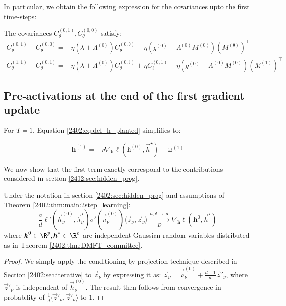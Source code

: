 In particular, we obtain the following expression for the covariances upto the first time-steps:
\begin{lemma}\label{2402:lem:cov_1}
The covariances $C_\theta^{(0,1)},C_\theta^{(0,0)}$ satisfy:
\begin{align}
    C_\theta^{(0,1)} - C_\theta^{(0,0)} =  - \eta \left(\lambda + \Lambda^{(0)}\right)C_\theta^{(0,0)} - \eta \left(g^{(0)} - \Lambda^{(0)}M^{(0)}\right) \left(M^{(0)}\right)^\top
\end{align}
\begin{align}
    C_\theta^{(1,1)} - C_\theta^{(0,1)} =  - \eta \left(\lambda + \Lambda^{(0)}\right)C_\theta^{(0,1)} + \eta C_\ell^{(0,1)} - \eta \left(g^{(0)} - \Lambda^{(0)}M^{(0)}\right) \left(M^{(1)}\right)^\top
\end{align}
\end{lemma}


\subsection{Pre-activations at the end of the first gradient update}\label{2402:sec:app:proof_hidden_prog}
For $T=1$, Equation \eqref{2402:eq:def_h_planted} simplifies to:

\begin{equation} \label{2402:eq:h_1}
        \boldsymbol{h}^{(1)} = - \eta \nabla_{\boldsymbol{h}} \ell(\boldsymbol{h}^{(0)}, \vec{h}^\star) + \boldsymbol{\omega}^{(1)}
    \end{equation}

We now show that the first term exactly correspond to the contributions considered in section \ref{2402:sec:hidden_prog}.

\begin{lemma}
Under the notation in section \ref{2402:sec:hidden_prog} and assumptions of Theorem \ref{2402:thm:main:2step_learning}:
\begin{equation}
      \frac{a}{d} \ell'\left(\vec h^{(0)}_\nu, \vec h^\star_\nu\right)\sigma'(\vec h^{(0)}_\nu)\langle \vec z_\nu, \vec z_\nu \rangle \xrightarrow[D]{n,d \rightarrow \infty} \nabla_{\boldsymbol{h}} \ell(\boldsymbol{h}^{0},\vec{h}^\star)
\end{equation}
where $\boldsymbol{h}^{0} \in \R^p, \boldsymbol{h}^* \in \R^k$ are independent Gaussian random variables distributed as in Theorem \ref{2402:thm:DMFT_committee}.
\end{lemma}
\begin{proof}
    We simply apply the conditioning by projection technique described in Section \ref{2402:sec:iterative} to $\vec z_\nu$ by expressing it as:
    $\vec{z}_\nu = \vec h^{(0)}_\nu + \frac{d-1}{d}\vec{z}'_\nu$, where $\vec{z}'_\nu$ is independent of $\vec h^{(0)}_\nu$.
    The result then follows from convergence in 
    probability of $\frac{1}{d} \langle \vec{z}'_\nu, \vec{z}'_\nu \rangle$ to $1$.
\end{proof}


